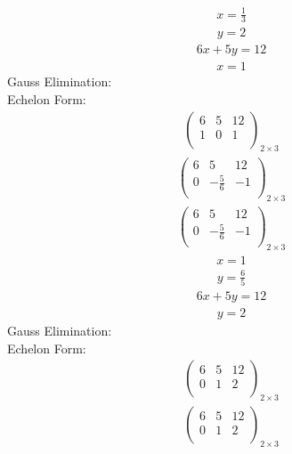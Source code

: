 \documentclass{article}
\begin{document}
\begin{align*}
x=\frac{1}{3}\end{align*}
\begin{align*}
y=2\end{align*}
\begin{align*}
6x + 5y=12\end{align*}
\begin{align*}
x=1\end{align*}
Gauss Elimination:\\
Echelon Form:\\
\begin{align*}
\left(
\begin{array}{cc|c}
6 & 5 & 12\\
1 & 0 & 1\\
\end{array}
\right)_{2\times 3}
\end{align*}
\begin{align*}
\left(
\begin{array}{cc|c}
6 & 5 & 12\\
0 & -\frac{5}{6} & -1\\
\end{array}
\right)_{2\times 3}
\end{align*}
\begin{align*}
\left(
\begin{array}{cc|c}
6 & 5 & 12\\
0 & -\frac{5}{6} & -1\\
\end{array}
\right)_{2\times 3}
\end{align*}
\begin{align*}
x=1\end{align*}
\begin{align*}
y=\frac{6}{5}\end{align*}
\begin{align*}
6x + 5y=12\end{align*}
\begin{align*}
y=2\end{align*}
Gauss Elimination:\\
Echelon Form:\\
\begin{align*}
\left(
\begin{array}{cc|c}
6 & 5 & 12\\
0 & 1 & 2\\
\end{array}
\right)_{2\times 3}
\end{align*}
\begin{align*}
\left(
\begin{array}{cc|c}
6 & 5 & 12\\
0 & 1 & 2\\
\end{array}
\right)_{2\times 3}
\end{align*}
\end{document}
